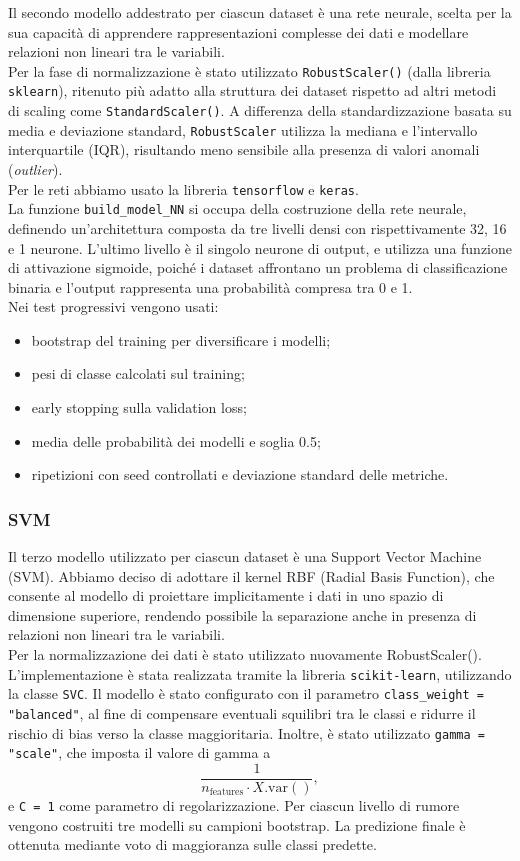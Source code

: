 \documentclass{article}
\begin{document}
Il secondo modello addestrato per ciascun dataset è una rete neurale, scelta per la sua capacità di apprendere rappresentazioni complesse dei dati e modellare relazioni non lineari tra le variabili.\\
Per la fase di normalizzazione è stato utilizzato \texttt{RobustScaler()} (dalla libreria \texttt{sklearn}), ritenuto più adatto alla struttura dei dataset rispetto ad altri metodi di scaling come \texttt{StandardScaler()}. A differenza della standardizzazione basata su media e deviazione standard, \texttt{RobustScaler} utilizza la mediana e l'intervallo interquartile (IQR), risultando meno sensibile alla presenza di valori anomali (\textit{outlier}).\\
Per le reti abbiamo usato la libreria \texttt{tensorflow} e  \texttt{keras}.\\
La funzione \texttt{build\_model\_NN} si occupa della costruzione della rete neurale, definendo un'architettura composta da tre livelli densi con rispettivamente 32, 16 e 1 neurone. L'ultimo livello è il singolo neurone di output, e utilizza una funzione di attivazione sigmoide, poiché i dataset affrontano un problema di classificazione binaria e l'output rappresenta una probabilità compresa tra 0 e 1.\\
Nei test progressivi vengono usati:
\begin{itemize}
    \item bootstrap del training per diversificare i modelli;
    \item pesi di classe calcolati sul training;
    \item early stopping sulla validation loss;
    \item media delle probabilità dei modelli e soglia 0.5;
    \item ripetizioni con seed controllati e deviazione standard delle metriche.
\end{itemize}


\newpage
\subsubsection{SVM}
Il terzo modello utilizzato per ciascun dataset è una Support Vector Machine (SVM). Abbiamo deciso di adottare il kernel RBF (Radial Basis Function), che consente al modello di proiettare implicitamente i dati in uno spazio di dimensione superiore, rendendo possibile la separazione anche in presenza di relazioni non lineari tra le variabili.\\
Per la normalizzazione dei dati è stato utilizzato nuovamente RobustScaler().
L'implementazione è stata realizzata tramite la libreria \texttt{scikit-learn}, utilizzando la classe \texttt{SVC}. 
Il modello è stato configurato con il parametro \texttt{class\_weight = "balanced"}, al fine di compensare eventuali squilibri tra le classi e ridurre il rischio di bias verso la classe maggioritaria. Inoltre, è stato utilizzato \texttt{gamma = "scale"}, che imposta il valore di gamma a
\[
\frac{1}{n_{\text{features}} \cdot X.\mathrm{var}()},
\]
e \texttt{C = 1} come parametro di regolarizzazione.
Per ciascun livello di rumore vengono costruiti tre modelli su campioni bootstrap. La predizione finale è ottenuta mediante voto di maggioranza sulle classi predette.
\end{document}

